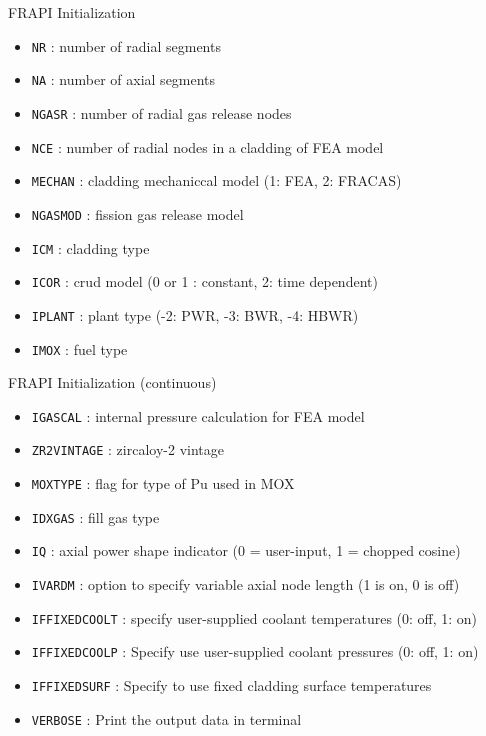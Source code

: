 \documentclass[11pt]{beamer}
\begin{document}
\begin{frame}{FRAPI Initialization}
  
  \scriptsize
  

  \begin{block}{}
    \begin{itemize}
    \item \texttt{NR} : number of radial segments
    \item \texttt{NA} : number of axial segments
    \item \texttt{NGASR} : number of radial gas release nodes
    \item \texttt{NCE} : number of radial nodes in a cladding of FEA model
    \item \texttt{MECHAN} : cladding mechaniccal model (1: FEA, 2: FRACAS)
    \item \texttt{NGASMOD} : fission gas release model
    \item \texttt{ICM} : cladding type
    \item \texttt{ICOR} : crud model (0 or 1 : constant, 2: time dependent)    
    \item \texttt{IPLANT} : plant type (-2: PWR, -3: BWR, -4: HBWR)
    \item \texttt{IMOX} : fuel type   
    \end{itemize}
  \end{block}
  
\end{frame}


\begin{frame}{FRAPI Initialization (continuous)}
  
  \scriptsize
  

  \begin{block}{}
    \begin{itemize}
    \item \texttt{IGASCAL} : internal pressure calculation for FEA model 
    \item \texttt{ZR2VINTAGE} : zircaloy-2 vintage
    \item \texttt{MOXTYPE} : flag for type of Pu used in MOX
    \item \texttt{IDXGAS} : fill gas type
    \item \texttt{IQ} : axial power shape indicator (0 = user-input, 1 = chopped cosine)
    \item \texttt{IVARDM} : option to specify variable axial node length (1 is on, 0 is off)
    \item \texttt{IFFIXEDCOOLT} : specify user-supplied coolant temperatures (0: off, 1: on)
    \item \texttt{IFFIXEDCOOLP} : Specify use user-supplied coolant pressures (0: off, 1: on)
    \item \texttt{IFFIXEDSURF} : Specify to use fixed cladding surface temperatures
    \item \texttt{VERBOSE} : Print the output data in terminal   
    \end{itemize}
  \end{block}
  
\end{frame}
\end{document}
